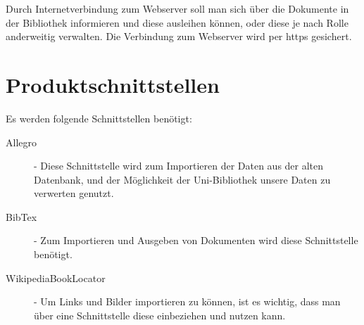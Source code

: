 Durch Internetverbindung zum Webserver soll man sich über die Dokumente in der Bibliothek informieren und diese ausleihen können, oder diese je nach Rolle anderweitig verwalten. Die Verbindung zum Webserver wird per https gesichert. 



\section{Produktschnittstellen}


Es werden folgende Schnittstellen benötigt: 
\begin{description}
\item [Allegro] - Diese Schnittstelle wird zum Importieren der Daten aus der alten Datenbank, und der Möglichkeit der Uni-Bibliothek unsere Daten zu verwerten genutzt.
\item [BibTex] - Zum Importieren und Ausgeben von Dokumenten wird diese Schnittstelle benötigt. 
\item [WikipediaBookLocator] - Um Links und Bilder importieren zu können, ist es wichtig, dass man über eine Schnittstelle diese einbeziehen und nutzen kann.
\end{description}


